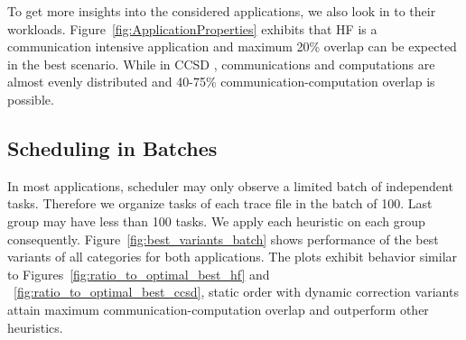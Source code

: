 \documentclass[sigconf]{acmart}
\begin{document}
{		
		
		
		To get more insights into the considered applications, we also look in to their workloads. Figure~\ref{fig:ApplicationProperties} exhibits that HF is a communication intensive application and maximum 20\% overlap can be expected in the best scenario. While in CCSD , communications and computations are almost evenly distributed and 40-75\% communication-computation overlap is possible.
		
		
		
		
		\subsection{Scheduling in Batches}
		In most applications, scheduler may only observe a limited batch of independent tasks. Therefore we organize tasks of each trace file in the batch of 100. Last group may have less than 100 tasks. We apply each heuristic on each group consequently. Figure~\ref{fig:best_variants_batch} shows performance of the best variants of all categories for both applications. The plots exhibit behavior similar to Figures~\ref{fig:ratio_to_optimal_best_hf} and ~\ref{fig:ratio_to_optimal_best_ccsd}, static order with dynamic correction variants attain maximum communication-computation overlap and outperform other heuristics.
		

}
\end{document}
